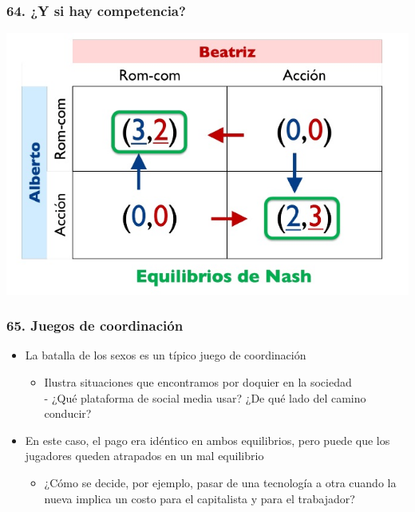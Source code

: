 \documentclass[14pt]{beamer}
\begin{document}
\begin{frame}
\frametitle{64. ¿Y si hay competencia?}
\centering
\includegraphics[scale=0.6]{Figures/Tema_03_33_batallasexo.jpg}
\end{frame}

\begin{frame}
\frametitle{65. Juegos de coordinación}
\begin{itemize}
        \item La batalla de los sexos es un típico juego de coordinación
        \begin{itemize}
            \item Ilustra situaciones que encontramos por doquier en la sociedad \\
            - ¿Qué plataforma de social media usar? ¿De qué lado del camino conducir?
        \end{itemize}
        \item En este caso, el pago era idéntico en ambos equilibrios, pero puede que los jugadores queden atrapados en un mal equilibrio
        \begin{itemize}
            \item ¿Cómo se decide, por ejemplo, pasar de una tecnología a otra cuando la nueva implica un costo para el capitalista y para el trabajador?
        \end{itemize}
\end{itemize}
\end{frame}
\end{document}
